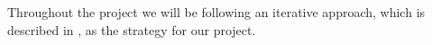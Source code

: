 Throughout the project we will be following an iterative approach, which is described in \cite{mathiassen2001objektorienteret}, as the strategy for our project.
